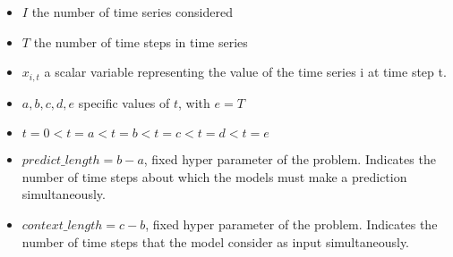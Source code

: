 \begin{itemize}%
    \item $I$ the number of time series considered
    \item $T$ the number of time steps in time series
    \item $x_{i,t}$ a scalar variable representing the value of the time series i at time step t.
    \item $a, b, c, d, e$ specific values of $t$, with $e=T$
    \item $t=0 < t=a < t=b < t=c < t=d < t=e$
    \item $predict\_length = b-a$, fixed hyper parameter of the problem.
    Indicates the number of time steps about which the models must make a prediction simultaneously.
    \item $context\_length = c-b$, fixed hyper parameter of the problem.
    Indicates the number of time steps that the model consider as input simultaneously.

\end{itemize}

